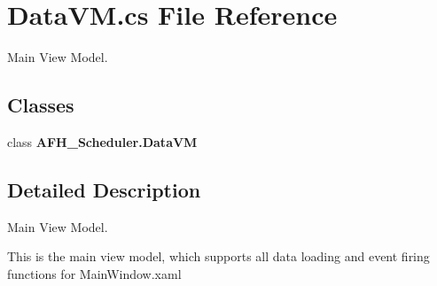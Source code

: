 \section{Data\+V\+M.\+cs File Reference}
\label{_data_v_m_8cs}


Main View Model.  


\subsection*{Classes}
\begin{DoxyCompactItemize}
\item 
class \textbf{ A\+F\+H\+\_\+\+Scheduler.\+Data\+VM}
\end{DoxyCompactItemize}


\subsection{Detailed Description}
Main View Model. 

This is the main view model, which supports all data loading and event firing functions for Main\+Window.\+xaml 